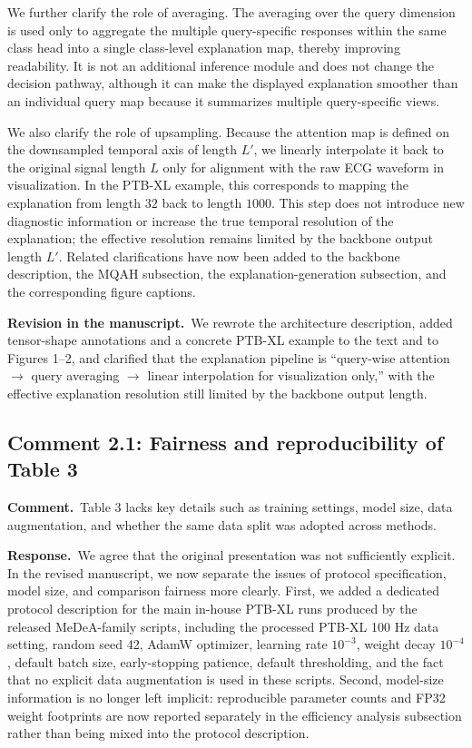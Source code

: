 \documentclass[11pt]{article}
\newcommand{\commentheader}{\textbf{Comment.}}
\newcommand{\responseheader}{\textbf{Response.}}
\newcommand{\revisionheader}{\textbf{Revision in the manuscript.}}
\begin{document}
We further clarify the role of averaging. The averaging over the query dimension is used only to aggregate the multiple query-specific responses within the same class head into a single class-level explanation map, thereby improving readability. It is not an additional inference module and does not change the decision pathway, although it can make the displayed explanation smoother than an individual query map because it summarizes multiple query-specific views.

We also clarify the role of upsampling. Because the attention map is defined on the downsampled temporal axis of length $L'$, we linearly interpolate it back to the original signal length $L$ only for alignment with the raw ECG waveform in visualization. In the PTB-XL example, this corresponds to mapping the explanation from length $32$ back to length $1000$. This step does not introduce new diagnostic information or increase the true temporal resolution of the explanation; the effective resolution remains limited by the backbone output length $L'$. Related clarifications have now been added to the backbone description, the MQAH subsection, the explanation-generation subsection, and the corresponding figure captions.

\revisionheader\ We rewrote the architecture description, added tensor-shape annotations and a concrete PTB-XL example to the text and to Figures 1--2, and clarified that the explanation pipeline is ``query-wise attention $\rightarrow$ query averaging $\rightarrow$ linear interpolation for visualization only,'' with the effective explanation resolution still limited by the backbone output length.

\subsection*{Comment 2.1: Fairness and reproducibility of Table 3}

\commentheader\ Table 3 lacks key details such as training settings, model size, data augmentation, and whether the same data split was adopted across methods.

\responseheader\ We agree that the original presentation was not sufficiently explicit. In the revised manuscript, we now separate the issues of protocol specification, model size, and comparison fairness more clearly. First, we added a dedicated protocol description for the main in-house PTB-XL runs produced by the released MeDeA-family scripts, including the processed PTB-XL 100 Hz data setting, random seed 42, AdamW optimizer, learning rate $10^{-3}$, weight decay $10^{-4}$, default batch size, early-stopping patience, default thresholding, and the fact that no explicit data augmentation is used in these scripts. Second, model-size information is no longer left implicit: reproducible parameter counts and FP32 weight footprints are now reported separately in the efficiency analysis subsection rather than being mixed into the protocol description.
\end{document}

